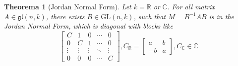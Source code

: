 \documentclass[12pt, a4paper]{article}
\newtheorem{theorem}{Theorema}[section]
\theoremstyle{definition}
\theoremstyle{remark}
\newcommand{\bb}[1]{\mathbb{#1}}
\newcommand{\gl}{\mathfrak{gl}}
\newcommand{\GL}{\text{GL}}
\begin{document}
\begin{theorem}[Jordan Normal Form]
	Let $k = \bb{R}$ or $\bb{C}$. For all matrix $A \in \gl(n, k)$, there exists $B \in \GL(n,k)$, such that $M = B^{-1}AB$ is in the Jordan Normal Form, which is diagonal with blocks like
	\[
		\begin{bmatrix}
			C & 1 & 0 & \cdots & 0 \\
			0 & C & 1 & \cdots & 0 \\
			\vdots & \vdots & \vdots & \ddots & \vdots \\
			0 & 0 & 0 & \cdots & C 
		\end{bmatrix},
		C_{\bb{R}} = \begin{bmatrix}
		a & b \\
		-b & a
	\end{bmatrix},
		 C_{\bb{C}} \in \bb{C}
	\]
\end{theorem}
\end{document}
